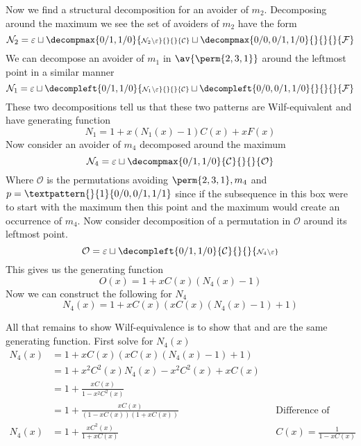 Now we find a structural decomposition for an avoider of \(m_2\).
Decomposing around the maximum we see the set of avoiders of \(m_2\)
have the form
\begin{equation*}
    \mathcal{N}_2 = \varepsilon \sqcup
    \decompmax{0/1,1/0}{\scriptstyle\mathcal{N}_2\setminus\varepsilon}{}{}{\mathcal{C}}
    \sqcup
    \decompmax{0/0,0/1,1/0}{}{}{}{\mathcal{F}}
\end{equation*}
We can decompose an avoider of \(m_1\) in \(\av{\perm{2,3,1}}\) around the leftmost point
in a similar manner
\begin{equation*}
    \mathcal{N}_1 = \varepsilon \sqcup
    \decompleft{0/1,1/0}{\scriptstyle\mathcal{N}_1\setminus\varepsilon}{}{}{\mathcal{C}}
    \sqcup
    \decompleft{0/0,0/1,1/0}{}{}{}{\mathcal{F}}
\end{equation*}
These two decompositions tell us that these two patterns are Wilf-equivalent
and have generating function
\begin{equation}
    N_1 = 1 + x(N_1(x)-1)C(x) +xF(x)
    \label{eqn:ngen}
\end{equation}
Now consider an avoider of \(m_4\) decomposed around the maximum
\begin{equation*}
    \mathcal{N}_4 = \varepsilon \sqcup
    \decompmax{0/1,1/0}{\mathcal{C}}{}{}{\mathcal{O}}
\end{equation*}
Where \(\mathcal{O}\) is the permutations avoiding \(\perm{2,3,1},m_4\) and
\(p = \textpattern{}{1}{0/0,0/1,1/1}\) since if the subsequence in this box
were to start with the maximum then this point and the maximum would create
an occurrence of \(m_4\).
Now consider decomposition of a permutation in \(\mathcal{O}\) around its
leftmost point.
\begin{equation*}
    \mathcal{O} = \varepsilon \sqcup
    \decompleft{0/1,1/0}{\mathcal{C}}{}{}{\scriptstyle\mathcal{N}_4\setminus\varepsilon}
\end{equation*}
This gives us the generating function
\begin{equation*}
    O(x) = 1 + xC(x)(N_4(x)-1)
\end{equation*}
Now we can construct the following for \(N_4\)
\begin{equation}
    N_4(x) = 1 +xC(x)(xC(x)(N_4(x)-1)+1)
    \label{eqn:ngen2}
\end{equation}

All that remains to show Wilf-equivalence is to show that  and
 are the same generating function.
First solve  for \(N_4(x)\)
\begin{equation}
    \begin{aligned}
        N_4(x) &= 1+xC(x)(xC(x)(N_4(x)-1)+1)\\
        &= 1 + x^2C^2(x)N_4(x) -x^2C^2(x) +xC(x)\\
        &= 1 + \frac{xC(x)}{1 - x^2C^2(x)}\\
        &= 1 + \frac{xC(x)}{(1-xC(x))(1+xC(x))} && \text{Difference of squares}\\
        N_4(x)&= 1 + \frac{xC^2(x)}{1+xC(x)} && C(x) = \frac{1}{1-xC(x)}
    \end{aligned}
\end{equation}

